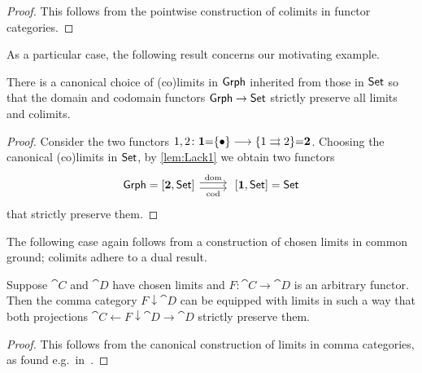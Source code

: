 \documentclass{amsart}
\begin{document}
\begin{proof}
 This follows from the pointwise construction of colimits in functor categories.
\end{proof}

As a particular case, the following result concerns our motivating example.
\begin{cor}
There is a canonical choice of (co)limits in $\mathsf{Grph}$ inherited from those in $\mathsf{Set}$ so that the domain and codomain functors $\mathsf{Grph}\to\mathsf{Set}$ strictly preserve all limits and colimits.
\end{cor}

\begin{proof}
 Consider the two functors $1,2\colon\mathbf{1}{=}\{\bullet\}\longrightarrow\{1\rightrightarrows2\}{=}\mathbf{2}$. Choosing the canonical (co)limits in $\mathsf{Set}$, by \cref{lem:Lack1} we obtain two functors
\begin{displaymath}
\begin{tikzcd}
 \Grph=[\two,\Set]\ar[r,shift left,"\mathrm{dom}"]\ar[r,shift right,"\mathrm{cod}"'] & \;[\one,\Set]=\Set
 \end{tikzcd}
\end{displaymath}
that strictly preserve them.
\end{proof}

The following case again follows from a construction of chosen limits in common ground; colimits adhere to a dual result.
\begin{lem}
Suppose $\cat{C}$ and $\cat{D}$ have chosen limits and $F\colon\cat{C}\to\cat{D}$ is an arbitrary functor. Then the comma category $F\downarrow\cat{D}$ can be equipped with limits in such a way that both projections $\cat{C}\leftarrow F\downarrow\cat{D}\to\cat{D}$ strictly preserve them.
\end{lem}

\begin{proof}
 This follows from the canonical construction of limits in comma categories, as found e.g.\ in~\cite[\S 2.16]{Handbook1}.
\end{proof}
\end{document}

